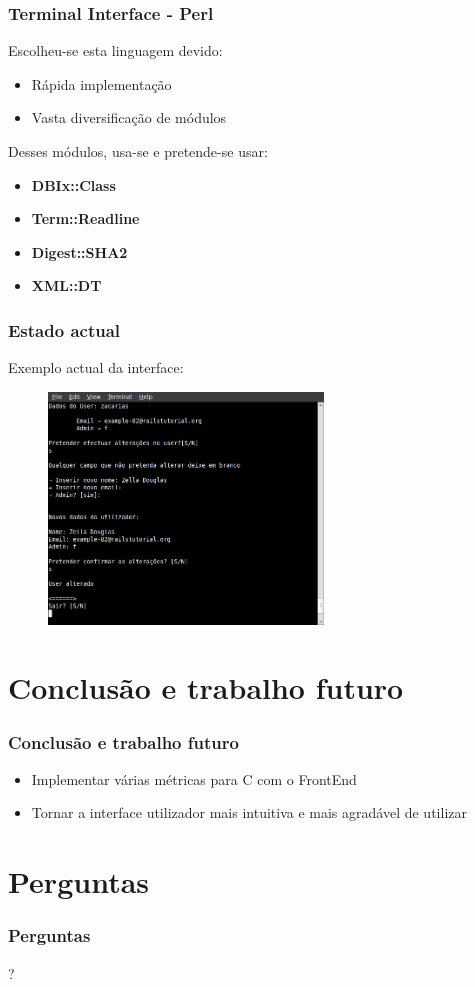 \documentclass{beamer}
\begin{document}
\begin{frame} \frametitle{Terminal Interface - Perl}
Escolheu-se esta linguagem devido:
\begin{itemize}
 \item Rápida implementação
 \item Vasta diversificação de módulos
\end{itemize}
Desses módulos, usa-se e pretende-se usar:
\begin{itemize}
 \item \textbf{DBIx::Class}
 \item \textbf{Term::Readline}
 \item \textbf{Digest::SHA2}
 \item \textbf{XML::DT}
\end{itemize}
\end{frame}

\begin{frame} \frametitle{Estado actual}
 Exemplo actual da interface:
\begin{figure}[H]
\begin{center}
\includegraphics[width=0.65\textwidth]{imagens/zacarias}
\end{center}
\end{figure} 
\end{frame}


\section{Conclusão e trabalho futuro}
\begin{frame} \frametitle{Conclusão e trabalho futuro}
\begin{itemize}
\item Implementar várias métricas para C com o FrontEnd
\item Tornar a interface utilizador mais intuitiva e mais agradável de utilizar
\end{itemize}
\end{frame}


\section*{Perguntas}
\begin{frame} \frametitle{Perguntas}
\begin{center}\huge{?}\end{center}
\end{frame}
\end{document}
